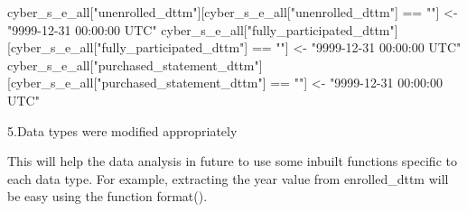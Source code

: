 \documentclass[
]{article}
\newenvironment{Shaded}{\begin{snugshade}}{\end{snugshade}}
\newcommand{\AttributeTok}[1]{\textcolor[rgb]{0.77,0.63,0.00}{#1}}
\newcommand{\CommentTok}[1]{\textcolor[rgb]{0.56,0.35,0.01}{\textit{#1}}}
\newcommand{\FunctionTok}[1]{\textcolor[rgb]{0.00,0.00,0.00}{#1}}
\newcommand{\NormalTok}[1]{#1}
\newcommand{\OtherTok}[1]{\textcolor[rgb]{0.56,0.35,0.01}{#1}}
\newcommand{\SpecialCharTok}[1]{\textcolor[rgb]{0.00,0.00,0.00}{#1}}
\newcommand{\StringTok}[1]{\textcolor[rgb]{0.31,0.60,0.02}{#1}}
\begin{document}
\begin{Shaded}
\begin{Highlighting}[]
\NormalTok{cyber\_s\_e\_all[}\StringTok{"unenrolled\_dttm"}\NormalTok{][cyber\_s\_e\_all[}\StringTok{"unenrolled\_dttm"}\NormalTok{] }\SpecialCharTok{==} \StringTok{""}\NormalTok{] }\OtherTok{\textless{}{-}} \StringTok{"9999{-}12{-}31 00:00:00 UTC"}
\NormalTok{cyber\_s\_e\_all[}\StringTok{"fully\_participated\_dttm"}\NormalTok{][cyber\_s\_e\_all[}\StringTok{"fully\_participated\_dttm"}\NormalTok{] }\SpecialCharTok{==} \StringTok{""}\NormalTok{] }\OtherTok{\textless{}{-}} \StringTok{"9999{-}12{-}31 00:00:00 UTC"}
\NormalTok{cyber\_s\_e\_all[}\StringTok{"purchased\_statement\_dttm"}\NormalTok{][cyber\_s\_e\_all[}\StringTok{"purchased\_statement\_dttm"}\NormalTok{] }\SpecialCharTok{==} \StringTok{""}\NormalTok{] }\OtherTok{\textless{}{-}} \StringTok{"9999{-}12{-}31 00:00:00 UTC"}
\end{Highlighting}
\end{Shaded}

\hfill\break
5.Data types were modified appropriately

This will help the data analysis in future to use some inbuilt functions
specific to each data type. For example, extracting the year value from
enrolled\_dttm will be easy using the function format().

\begin{Shaded}
\end{Shaded}
\end{document}
